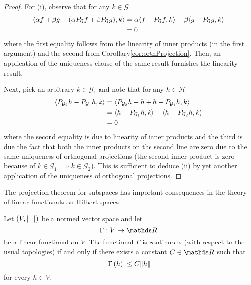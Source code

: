 \begin{proof}
For (i), observe that for any $k\in\mathcal{G}$
\begin{align*}
\langle\alpha f+\beta g-(\alpha P_{\mathcal{G}}f+\beta P_{\mathcal{G}}g),k\rangle & =\alpha\langle f-P_{\mathcal{G}}f,k\rangle-\beta\langle g-P_{\mathcal{G}}g,k\rangle\\
 & =0
\end{align*}
where the first equality follows from the linearity of inner products
(in the first argument) and the second from Corollary\ref{cor:orthProjection}.
Then, an application of the uniqueness clause of the same result furnishes
the linearity result.

Next, pick an arbitrary $k\in\mathcal{G}_{1}$ and note that for any
$h\in\mathcal{H}$
\begin{align*}
\langle P_{\mathcal{G}_{2}}h-P_{\mathcal{G}_{1}}h,k\rangle & =\langle P_{\mathcal{G}_{2}}h-h+h-P_{\mathcal{G}_{1}}h,k\rangle\\
 & =\langle h-P_{\mathcal{G}_{1}}h,k\rangle-\langle h-P_{\mathcal{G}_{2}}h,k\rangle\\
 & =0
\end{align*}
where the second equality is due to linearity of inner products and
the third is due the fact that both the inner products on the second
line are zero due to the same uniqueness of orthogonal projections
(the second inner product is zero because of $k\in\mathcal{G}_{1}\implies k\in\mathcal{G}_{2}$).
This is sufficient to deduce (ii) by yet another application of the
uniqueness of orthogonal projections.
\end{proof}
The projection theorem for subspaces has important consequences in
the theory of linear functionals on Hilbert spaces.
\begin{prop}
\label{prop:linearFunctionalContinuity}Let $\left(V,\lVert\cdot\rVert_{}\right)$
be a normed vector space and let
\[
\Gamma:V\to\R
\]
be a linear functional on $V.$ The functional $\Gamma$ is continuous
(with respect to the usual topologies) if and only if there exists
a constant $C\in\R$ such that
\begin{equation}
\lvert\Gamma\left(h\right)\rvert\leq C\lVert h\rVert_{}\label{eq:continuityConditionLinFunc}
\end{equation}
for every $h\in V.$
\end{prop}

